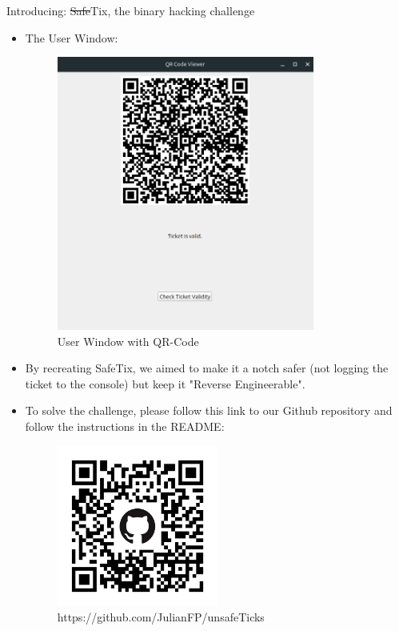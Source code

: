 \documentclass[final,dvipsnames]{beamer}
\newlength{\colwidth}
\begin{document}
\begin{frame}[t, fragile]
\begin{columns}[t]
\begin{column}{\colwidth}
\begin{block}{Introducing: \sout{Safe}Tix, the binary hacking challenge}
\begin{itemize}
\begin{figure}[h]
				\caption{WorkFlow of the Program}
				\label{fig:WorkFlow1}
			\end{figure}
            \item The User Window:
            \begin{figure}[h]
				\centering
				\includegraphics[width=0.8\textwidth]{figures/QR_Window.png}
				\caption{User Window with QR-Code}
				\label{fig:WorkFlow1}
			\end{figure}
            \item By recreating SafeTix, we aimed to make it a notch safer (not logging the ticket to the console) but keep it "Reverse Engineerable".
            
            \item To solve the challenge, please follow this link to our Github repository and follow the instructions in the README:
            \begin{figure}
                \centering
                \includegraphics[width=0.5\textwidth]{figures/github_qr_code.png}
                \caption{https://github.com/JulianFP/unsafeTicks}
                \label{fig:GithubQRCode}
            \end{figure}
		\end{itemize}
	\end{block}


\end{column}
\end{columns}
\end{frame}
\end{document}
